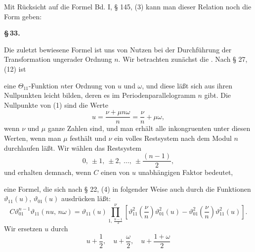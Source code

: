 Mit Rücksicht auf die Formel Bd. I, § 145, (3) kann man dieser Relation noch die Form geben:


\begin{center}
\textbf{\S\,33. }
\end{center}

Die zuletzt bewiesene Formel ist uns von Nutzen bei der Durchführung der Transformation ungerader Ordnung $n$. Wir betrachten zunächst die . Nach § 27, (12) ist


eine $\Theta_{11}$-Funktion $n$ter Ordnung von $u$ und $\omega$, und diese läßt sich aus ihren Nullpunkten leicht bilden, deren es im Periodenparallelogramm $n$ gibt. Die Nullpunkte von (1) sind die Werte
\[
u = \frac{\nu + \mu n\omega}{n} = \frac{\nu}{n} + \mu\omega,
\]
wenn $\nu$ und $\mu$ ganze Zahlen sind, und man erhält alle inkongruenten unter diesen Werten, wenn man $\mu$ festhält und $\nu$ ein volles Restsystem nach dem Modul $n$ durchlaufen läßt. Wir wählen das Restsystem
\[
0,\ \pm 1,\ \pm 2,\ \ldots,\ \pm\frac{(n-1)}{2},
\]
und erhalten demnach, wenn $C$ einen von $u$ unabhängigen Faktor bedeutet,


eine Formel, die sich nach § 22, (4) in folgender Weise auch durch die Funktionen $\vartheta_{11}(u)$, $\vartheta_{01}(u)$ ausdrücken läßt:
\[
C\vartheta_{01}^{n-1}\vartheta_{11}(nu,\,n\omega) = \vartheta_{11}(u) \prod_{1,\,\frac{n-1}{2}}^{\nu} \left[\vartheta_{11}^2\left(\frac{\nu}{n}\right)\vartheta_{01}^2(u) - \vartheta_{01}^2\left(\frac{\nu}{n}\right)\vartheta_{11}^2(u)\right].
\]
Wir ersetzen $u$ durch
\[
u + \frac{1}{2}, \quad u + \frac{\omega}{2}, \quad u + \frac{1+\omega}{2}
\]
